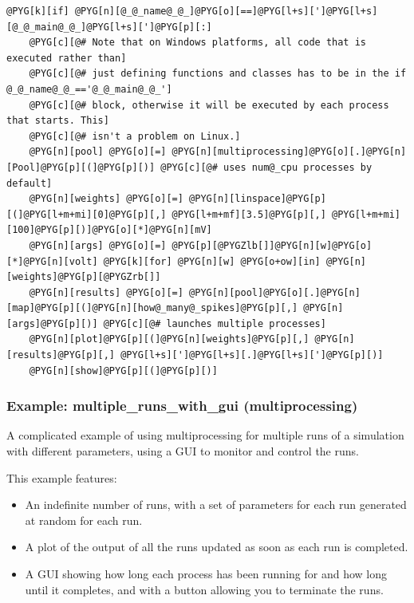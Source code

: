 \documentclass[letterpaper,10pt,english]{manual}
\begin{document}
\begin{Verbatim}[commandchars=@\[\]]
@PYG[k][if] @PYG[n][@_@_name@_@_]@PYG[o][==]@PYG[l+s][']@PYG[l+s][@_@_main@_@_]@PYG[l+s][']@PYG[p][:]
    @PYG[c][@# Note that on Windows platforms, all code that is executed rather than]
    @PYG[c][@# just defining functions and classes has to be in the if @_@_name@_@_=='@_@_main@_@_']
    @PYG[c][@# block, otherwise it will be executed by each process that starts. This]
    @PYG[c][@# isn't a problem on Linux.]
    @PYG[n][pool] @PYG[o][=] @PYG[n][multiprocessing]@PYG[o][.]@PYG[n][Pool]@PYG[p][(]@PYG[p][)] @PYG[c][@# uses num@_cpu processes by default]
    @PYG[n][weights] @PYG[o][=] @PYG[n][linspace]@PYG[p][(]@PYG[l+m+mi][0]@PYG[p][,] @PYG[l+m+mf][3.5]@PYG[p][,] @PYG[l+m+mi][100]@PYG[p][)]@PYG[o][*]@PYG[n][mV]
    @PYG[n][args] @PYG[o][=] @PYG[p][@PYGZlb[]]@PYG[n][w]@PYG[o][*]@PYG[n][volt] @PYG[k][for] @PYG[n][w] @PYG[o+ow][in] @PYG[n][weights]@PYG[p][@PYGZrb[]]
    @PYG[n][results] @PYG[o][=] @PYG[n][pool]@PYG[o][.]@PYG[n][map]@PYG[p][(]@PYG[n][how@_many@_spikes]@PYG[p][,] @PYG[n][args]@PYG[p][)] @PYG[c][@# launches multiple processes]
    @PYG[n][plot]@PYG[p][(]@PYG[n][weights]@PYG[p][,] @PYG[n][results]@PYG[p][,] @PYG[l+s][']@PYG[l+s][.]@PYG[l+s][']@PYG[p][)]
    @PYG[n][show]@PYG[p][(]@PYG[p][)]
\end{Verbatim}

\resetcurrentobjects
\hypertarget{--doc-examples-multiprocessing_multiple_runs_with_gui}{}

\hypertarget{example-multiprocessing-multiple-runs-with-gui}{}\subsubsection{Example: multiple\_runs\_with\_gui (multiprocessing)}

A complicated example of using multiprocessing for multiple runs of a simulation
with different parameters, using a GUI to monitor and control the runs.

This example features:
\begin{itemize}
\item {} 
An indefinite number of runs, with a set of parameters for each run generated
at random for each run.

\item {} 
A plot of the output of all the runs updated as soon as each run is completed.

\item {} 
A GUI showing how long each process has been running for and how long until
it completes, and with a button allowing you to terminate the runs.

\end{itemize}
\end{document}
